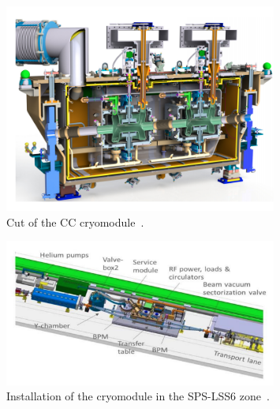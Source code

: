 \begin{figure}[h]
   \centering         
   \includegraphics[width=0.8\textwidth]{images/Ch4/CC_cryomodule.png}
       \caption{Cut of the CC cryomodule~\cite{Zanoni:2017}.}
       \label{fig:DQW_cryomodule}
\end{figure}

\begin{figure}[h]
   \centering         
   \includegraphics[width=0.8\textwidth]{images/Ch4/CC_location_SPS_LSS6.png}
       \caption{Installation of the cryomodule in the SPS-LSS6 zone~\cite{Calaga:2649807}.}
       \label{fig:CC_SPS_LSS6}
\end{figure}

